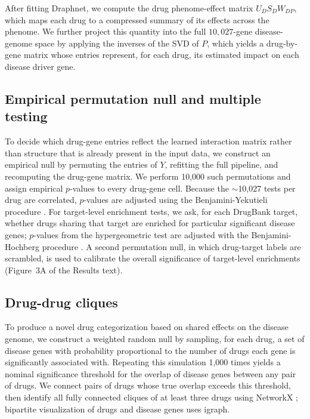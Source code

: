 \documentclass[11pt]{article}
\begin{document}
After fitting Draphnet, we compute the drug phenome-effect matrix
$U_D S_D W_{DP}$, which maps each drug to a compressed summary of its
effects across the phenome. We further project this quantity into the
full $10{,}027$-gene disease-genome space by applying the inverses of
the SVD of $P$, which yields a drug-by-gene matrix whose entries
represent, for each drug, its estimated impact on each disease driver
gene.

\subsection{Empirical permutation null and multiple testing}

To decide which drug-gene entries reflect the learned interaction
matrix rather than structure that is already present in the input data,
we construct an empirical null by permuting the entries of $Y$,
refitting the full pipeline, and recomputing the drug-gene matrix. We
perform 10,000 such permutations and assign empirical $p$-values to
every drug-gene cell. Because the $\sim$10,027 tests per drug are
correlated, $p$-values are adjusted using the Benjamini-Yekutieli
procedure \citep{benjamini2001fdrdependency}. For target-level
enrichment tests, we ask, for each DrugBank target, whether drugs
sharing that target are enriched for particular significant disease
genes; $p$-values from the hypergeometric test are adjusted with the
Benjamini-Hochberg procedure \citep{benjamini1995fdr}. A second
permutation null, in which drug-target labels are scrambled, is used to
calibrate the overall significance of target-level enrichments
(Figure~3A of the Results text).

\subsection{Drug-drug cliques}

To produce a novel drug categorization based on shared effects on the
disease genome, we construct a weighted random null by sampling, for
each drug, a set of disease genes with probability proportional to the
number of drugs each gene is significantly associated with. Repeating
this simulation 1,000 times yields a nominal significance threshold for
the overlap of disease genes between any pair of drugs. We connect
pairs of drugs whose true overlap exceeds this threshold, then identify
all fully connected cliques of at least three drugs using NetworkX
\citep{hagberg2008networkx}; bipartite visualization of drugs and
disease genes uses igraph.
\end{document}
